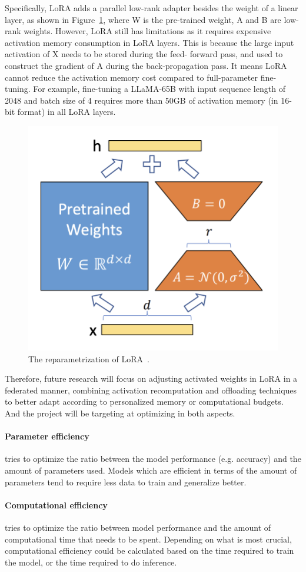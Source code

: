 \documentclass[withindex,glossary,firstyr]{cam-thesis}
\begin{document}
Specifically, LoRA adds a parallel low-rank adapter besides the weight of a linear layer, as shown in Figure~\ref{fig:lora}, where W is the pre-trained weight, A and B are low-rank weights. However, LoRA still has limitations as it requires expensive activation memory consumption in LoRA layers. This is because the large input activation of X needs to be stored during the feed- forward pass, and used to construct the gradient of A during the back-propagation pass. It means LoRA cannot reduce the activation memory cost compared to full-parameter fine-tuning. For example, fine-tuning a LLaMA-65B with input sequence length of 2048 and batch size of 4 requires more than 50GB of activation memory (in 16-bit format) in all LoRA layers. 

\begin{figure}[t]
\centering
    \includegraphics[width=0.4\linewidth]{lora.jpg}
\caption{The reparametrization of LoRA~\cite{lora}.}
\label{fig:lora}
\vspace{-5mm}
\end{figure}

Therefore, future research will focus on adjusting activated weights in LoRA in a federated manner, combining activation recomputation and offloading techniques to better adapt according to personalized memory or computational budgets. And the project will be targeting at optimizing in both aspects.

\paragraph{Parameter efficiency} tries to optimize the ratio between the model performance (e.g. accuracy) and the amount of parameters used. Models which are efficient in terms of the amount of parameters tend to require less data to train and generalize better.

\paragraph{Computational efficiency} tries to optimize the ratio between model performance and the amount of computational time that needs to be spent. Depending on what is most crucial, computational efficiency could be calculated based on the time required to train the model, or the time required to do inference. 
\end{document}
